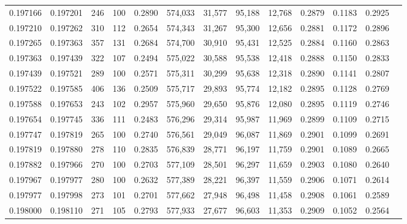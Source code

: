 \begin{tabular}{rrrrrrrrrrrrr}
0.197166 & 0.197201 &   246 & 100 &                                     0.2890 & 574,033 &  31,577 &  95,188 &  12,768 & 0.2879 & 0.1183 & 0.2925 \\
0.197210 & 0.197262 &   310 & 112 &                                     0.2654 & 574,343 &  31,267 &  95,300 &  12,656 & 0.2881 & 0.1172 & 0.2896 \\
0.197265 & 0.197363 &   357 & 131 &                                     0.2684 & 574,700 &  30,910 &  95,431 &  12,525 & 0.2884 & 0.1160 & 0.2863 \\
0.197363 & 0.197439 &   322 & 107 &                                     0.2494 & 575,022 &  30,588 &  95,538 &  12,418 & 0.2888 & 0.1150 & 0.2833 \\
0.197439 & 0.197521 &   289 & 100 &                                     0.2571 & 575,311 &  30,299 &  95,638 &  12,318 & 0.2890 & 0.1141 & 0.2807 \\
0.197522 & 0.197585 &   406 & 136 &                                     0.2509 & 575,717 &  29,893 &  95,774 &  12,182 & 0.2895 & 0.1128 & 0.2769 \\
0.197588 & 0.197653 &   243 & 102 &                                     0.2957 & 575,960 &  29,650 &  95,876 &  12,080 & 0.2895 & 0.1119 & 0.2746 \\
0.197654 & 0.197745 &   336 & 111 &                                     0.2483 & 576,296 &  29,314 &  95,987 &  11,969 & 0.2899 & 0.1109 & 0.2715 \\
0.197747 & 0.197819 &   265 & 100 &                                     0.2740 & 576,561 &  29,049 &  96,087 &  11,869 & 0.2901 & 0.1099 & 0.2691 \\
0.197819 & 0.197880 &   278 & 110 &                                     0.2835 & 576,839 &  28,771 &  96,197 &  11,759 & 0.2901 & 0.1089 & 0.2665 \\
0.197882 & 0.197966 &   270 & 100 &                                     0.2703 & 577,109 &  28,501 &  96,297 &  11,659 & 0.2903 & 0.1080 & 0.2640 \\
0.197967 & 0.197977 &   280 & 100 &                                     0.2632 & 577,389 &  28,221 &  96,397 &  11,559 & 0.2906 & 0.1071 & 0.2614 \\
0.197977 & 0.197998 &   273 & 101 &                                     0.2701 & 577,662 &  27,948 &  96,498 &  11,458 & 0.2908 & 0.1061 & 0.2589 \\
0.198000 & 0.198110 &   271 & 105 &                                     0.2793 & 577,933 &  27,677 &  96,603 &  11,353 & 0.2909 & 0.1052 & 0.2564 \\

\end{tabular}
